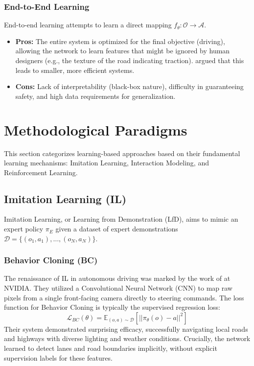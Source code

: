 \documentclass[12pt, a4paper]{article}
\begin{document}
\subsubsection{End-to-End Learning}
End-to-end learning attempts to learn a direct mapping $f_\theta: \mathcal{O} \rightarrow \mathcal{A}$.
\begin{itemize}
    \item \textbf{Pros:} The entire system is optimized for the final objective (driving), allowing the network to learn features that might be ignored by human designers (e.g., the texture of the road indicating traction). \cite{bojarski2016end} argued that this leads to smaller, more efficient systems.
    \item \textbf{Cons:} Lack of interpretability (black-box nature), difficulty in guaranteeing safety, and high data requirements for generalization.
\end{itemize}

\section{Methodological Paradigms}
\label{sec:methods}

This section categorizes learning-based approaches based on their fundamental learning mechanisms: Imitation Learning, Interaction Modeling, and Reinforcement Learning.

\subsection{Imitation Learning (IL)}
Imitation Learning, or Learning from Demonstration (LfD), aims to mimic an expert policy $\pi_E$ given a dataset of expert demonstrations $\mathcal{D} = \{(o_1, a_1), \dots, (o_N, a_N)\}$.

\subsubsection{Behavior Cloning (BC)}
The renaissance of IL in autonomous driving was marked by the work of \cite{bojarski2016end} at NVIDIA. They utilized a Convolutional Neural Network (CNN) to map raw pixels from a single front-facing camera directly to steering commands.
The loss function for Behavior Cloning is typically the supervised regression loss:
\begin{equation}
    \mathcal{L}_{BC}(\theta) = \mathbb{E}_{(o, a) \sim \mathcal{D}} \left[ || \pi_\theta(o) - a ||^2 \right]
\end{equation}
Their system demonstrated surprising efficacy, successfully navigating local roads and highways with diverse lighting and weather conditions. Crucially, the network learned to detect lanes and road boundaries implicitly, without explicit supervision labels for these features.
\end{document}
